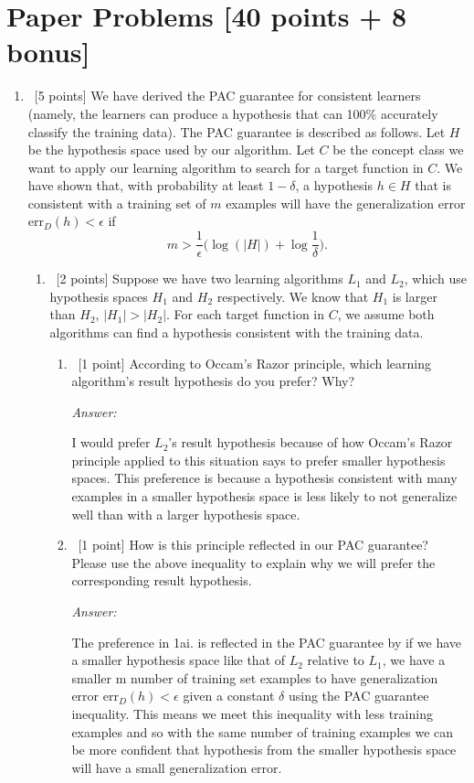 \documentclass[12pt, fullpage,letterpaper]{article}
\begin{document}
\section{Paper Problems [40 points + 8 bonus]}
\begin{enumerate}
\item~[5 points] We have derived the PAC guarantee for consistent learners (namely, the learners can produce a hypothesis that can 100\% accurately classify the training data). The PAC guarantee is described as follows. Let $H$ be the hypothesis space used by our algorithm. Let $C$ be the concept class we want to apply our learning algorithm to search for a target function in $C$. We have shown that,  with probability at least $1-\delta$, a hypothesis $h\in H$ that is consistent with a training set of $m$ examples will have the generalization error $\mathrm{err}_D(h) < \epsilon$ if 
\[
m > \frac{1}{\epsilon}\big(\log(|H|) + \log\frac{1}{\delta}\big).
\]

\begin{enumerate}
	\item~[2 points] Suppose we have two learning algorithms $L_1$ and $L_2$, which use hypothesis spaces $H_1$ and $H_2$ respectively. We know that $H_1$ is larger than $H_2$, \ie $|H_1| > |H_2|$.
	For each target function in $C$, we assume both algorithms can find a hypothesis consistent with the training data. 
	\begin{enumerate}
		\item~[1 point] According to Occam's Razor principle, which learning algorithm's  result hypothesis do you prefer? Why?

		\textit{Answer:}

		I would prefer $L_2$'s result hypothesis because of how Occam's Razor principle applied to this situation says to prefer smaller hypothesis spaces. 
		This preference is because a hypothesis consistent with many examples in a smaller hypothesis space is less likely to not generalize well than with a larger hypothesis space.

		\item~[1 point]  How is this principle reflected in our PAC guarantee? Please use the above inequality to explain why we will prefer the corresponding result hypothesis. 

		\textit{Answer:}

		The preference in 1ai. is reflected in the PAC guarantee by if we have a smaller hypothesis space like that of $L_2$ relative to $L_1$, we have a smaller m number of training set examples to have generalization error $\mathrm{err}_D(h) < \epsilon$ given a constant $\delta$ using the PAC guarantee inequality. 
		This means we meet this inequality with less training examples and so with the same number of training examples we can be more confident that hypothesis from the smaller hypothesis space will have a small generalization error.


\end{enumerate}
\end{enumerate}
\end{enumerate}
\end{document}
